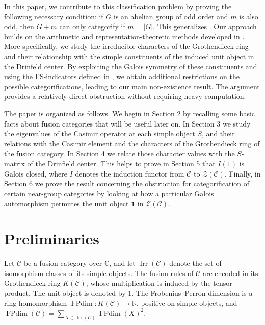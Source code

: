 \documentclass[a4paper,twoside,11pt]{amsart}
\theoremstyle{plain} %
\theoremstyle{definition}
\begin{document}
In this paper, we contribute to this classification problem by proving the following necessary condition: if $G$ is an abelian group of odd order and $m$ is also odd, then $G+m$ can only categorify if $m=|G|$. This generalizes \cite[Proposition 4.4]{Sch}. Our approach builds on the arithmetic and representation-theoretic methods developed in \cite{O2}. More specifically, we study the irreducible characters of the Grothendieck ring and their relationship with the simple constituents of the induced unit object in the Drinfeld center. By exploiting the Galois symmetry of these constituents and using the FS-indicators defined in \cite{NS}, we obtain additional restrictions on the possible categorifications, leading to our main non-existence result. The argument provides a relatively direct obstruction without requiring heavy computation.
\medskip

The paper is organized as follows. We begin in Section 2 by recalling some basic facts about fusion categories that will be useful later on. In Section 3 we study the eigenvalues of the Casimir operator at each simple object $S$, and their relations with the Casimir element and the characters of the Grothendieck ring of the fusion category. In Section 4 we relate those character values with the $S$-matrix of the Drinfield center. This helps to prove in Section 5 that $I(1)$ is Galois closed, where $I$ denotes the induction functor from $\mathcal{C}$ to $\mathcal{Z}(\mathcal{C})$. Finally, in Section $6$ we prove the result concerning the obstruction for categorification of certain near-group categories by looking at how a particular Galois automorphism permutes the unit object $\mathbf{1}$ in $\mathcal{Z}(\mathcal{C})$.
\bigskip





\section{Preliminaries}
Let $\mathcal{C}$ be a fusion category over $\mathbb{C}$, and let $\operatorname{Irr}(\mathcal{C})$ denote the set of isomorphism classes of its simple objects. The fusion rules of $\mathcal{C}$ are encoded in its Grothendieck ring $K(\mathcal{C})$, whose multiplication is induced by the tensor product. The unit object is denoted by $1$. The Frobenius--Perron dimension is a ring homomorphism $\operatorname{FPdim}:K(\mathcal{C})\to\mathbb{R}$, positive on simple objects, and $\operatorname{FPdim}(\mathcal{C})
=\sum_{X\in\operatorname{Irr}(\mathcal{C})}\operatorname{FPdim}(X)^2$.
\medskip
\end{document}

